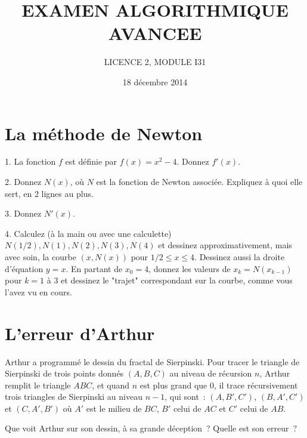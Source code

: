 \documentclass[11pt]{article}
\begin{document}
\title{EXAMEN ALGORITHMIQUE AVANCEE}
\author{LICENCE 2, MODULE I31}
\date{18 décembre 2014} 
\maketitle
\newif\ifcorrige
\corrigetrue

\newcommand{\smallbullet}{\,\begin{picture}(-1,1)(-1,-3)\circle*{2}\end{picture}\ }


\bigskip

\section{La méthode de Newton}

1. La fonction $f$ est définie par $f(x)=x^2-4$. Donnez $f'(x)$.

2. Donnez  $N(x)$, où $N$ est la fonction de Newton associée.
Expliquez à quoi elle sert, en 2 lignes au plus.

3. Donnez $N'(x)$.

4. Calculez (à la main ou avec une calculette) $N(1/2), N(1), N(2), N(3), N(4)$ et dessinez  approximativement, mais avec soin, la courbe $(x, N(x))$ pour $1/2 \le x \le 4$.
Dessinez aussi la droite d'équation $y=x$.
En partant de $x_0=4$, donnez les valeurs de $x_k= N(x_{k-1})$ pour $k=1$ à 3 et
dessinez le "trajet" correspondant sur la courbe, comme vous l'avez vu en cours.

\section{L'erreur d'Arthur}

Arthur a programmé le dessin du fractal de Sierpinski.
Pour tracer le triangle de Sierpinski de  trois points donnés $(A, B, C)$ au
niveau de récursion $n$,
Arthur remplit le triangle $ABC$, et quand $n$ est plus grand que 0, il 
trace récursivement trois triangles de Sierpinski  au niveau $n-1$, qui sont~: $(A, B', C')$,
$(B, A', C')$ et $(C, A', B')$ où $A'$ est le milieu de $BC$, $B'$ celui de $AC$ et $C'$ celui de $AB$. 

Que voit Arthur sur son dessin, à sa grande déception~?
Quelle est son erreur~? 
\end{document}
